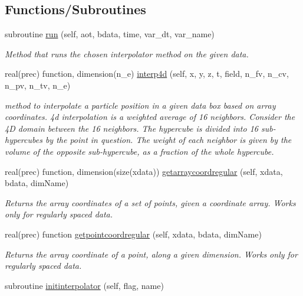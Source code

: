 \subsection*{Functions/\+Subroutines}
\begin{DoxyCompactItemize}
\item 
subroutine \mbox{\hyperlink{namespaceinterpolator__mod_a1c98c171b308ef58850102f67abcca95}{run}} (self, aot, bdata, time, var\+\_\+dt, var\+\_\+name)
\begin{DoxyCompactList}\small\item\em Method that runs the chosen interpolator method on the given data. \end{DoxyCompactList}\item 
real(prec) function, dimension(n\+\_\+e) \mbox{\hyperlink{namespaceinterpolator__mod_ac54a92d43721099e8e5bc5a888d7ee73}{interp4d}} (self, x, y, z, t, field, n\+\_\+fv, n\+\_\+cv, n\+\_\+pv, n\+\_\+tv, n\+\_\+e)
\begin{DoxyCompactList}\small\item\em method to interpolate a particle position in a given data box based on array coordinates. 4d interpolation is a weighted average of 16 neighbors. Consider the 4D domain between the 16 neighbors. The hypercube is divided into 16 sub-\/hypercubes by the point in question. The weight of each neighbor is given by the volume of the opposite sub-\/hypercube, as a fraction of the whole hypercube. \end{DoxyCompactList}\item 
real(prec) function, dimension(size(xdata)) \mbox{\hyperlink{namespaceinterpolator__mod_a6aca35ff7ad8ecb7c741c51f1863a30d}{getarraycoordregular}} (self, xdata, bdata, dim\+Name)
\begin{DoxyCompactList}\small\item\em Returns the array coordinates of a set of points, given a coordinate array. Works only for regularly spaced data. \end{DoxyCompactList}\item 
real(prec) function \mbox{\hyperlink{namespaceinterpolator__mod_aeb34e8a46a439ed5ca9115c405b225f1}{getpointcoordregular}} (self, xdata, bdata, dim\+Name)
\begin{DoxyCompactList}\small\item\em Returns the array coordinate of a point, along a given dimension. Works only for regularly spaced data. \end{DoxyCompactList}\item 
subroutine \mbox{\hyperlink{namespaceinterpolator__mod_adcaf3bba800f19991ed4f33c968184e9}{initinterpolator}} (self, flag, name)

\end{DoxyCompactItemize}
